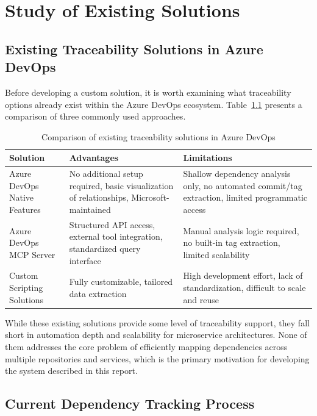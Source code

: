 \chapter{Study of Existing Solutions}
\label{chap:existing}

\section{Existing Traceability Solutions in Azure DevOps}
\label{sec:existing-traceability}

Before developing a custom solution, it is worth examining what traceability options already exist within the Azure DevOps ecosystem. Table~\ref{tab:existing-solutions} presents a comparison of three commonly used approaches.

\begin{table}[htbp]
\centering
\caption{Comparison of existing traceability solutions in Azure DevOps}
\label{tab:existing-solutions}
\small
\begin{tabular}{|p{3.5cm}|p{5cm}|p{5cm}|}
\hline
\textbf{Solution} & \textbf{Advantages} & \textbf{Limitations} \\
\hline
\hline
Azure DevOps Native Features & 
No additional setup required, basic visualization of relationships, Microsoft-maintained &
Shallow dependency analysis only, no automated commit/tag extraction, limited programmatic access \\
\hline
Azure DevOps MCP Server &
Structured API access, external tool integration, standardized query interface &
Manual analysis logic required, no built-in tag extraction, limited scalability \\
\hline
Custom Scripting Solutions &
Fully customizable, tailored data extraction &
High development effort, lack of standardization, difficult to scale and reuse \\
\hline
\end{tabular}
\end{table}

\vspace{0.3cm}
While these existing solutions provide some level of traceability support, they fall short in automation depth and scalability for microservice architectures. None of them addresses the core problem of efficiently mapping dependencies across multiple repositories and services, which is the primary motivation for developing the system described in this report.

\section{Current Dependency Tracking Process}

